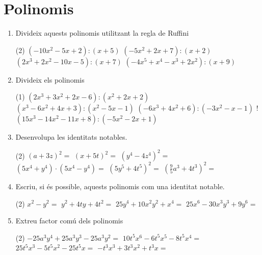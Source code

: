 \documentclass[a4paper]{article},
\begin{document}
  \section{Polinomis}
      \begin{enumerate}[resume]
    \item Divideix aquests polinomis utilitzant la regla de Ruffini
    \begin{tasks}(2)
      \task $\left(-10 x^{2} -5 x + 2\right) : \left( x + 5\right)$
      \task $\left(-5 x^{2} + 2 x + 7\right) : \left( x + 2\right)$
      \task $\left(2 x^{3} + 2 x^{2} -10 x -5\right) : \left( x + 7\right)$
      \task $\left(-4 x^{5} +  x^{4} - x^{3} + 2 x^{2}  \right) : \left( x + 9\right)$
    \end{tasks}
    \item Divideix els polinomis
    \begin{tasks}(1)
      \task $\left(2 x^{3} + 3 x^{2} + 2 x -6\right) : \left( x^{2} + 2 x + 2\right)$
      \task $\left( x^{3} -6 x^{2} + 4 x + 3\right) : \left( x^{2} -5 x -1\right)$
      \task $\left(-6 x^{3} + 4 x^{2}  + 6\right) : \left(-3 x^{2} - x -1\right)$
      \task! $\left(15 x^{3} -14 x^{2} -11 x + 8\right) : \left(-5 x^{2} -2 x + 1\right)$
    \end{tasks}
    \item Desenvolupa les identitats notables.
    \begin{tasks}(2)
      \task $\left(a + 3 z\right)^2 = {}$
      \task $\left(x + 5 t\right)^2 = {}$
      \task $\left(y^{4} - 4 z^{4}\right)^2 = {}$
      \task $\left(5 x^{4} + y^{4}\right) \cdot \left(5 x^{4} - y^{4}\right) = {}$
      \task $\left(5 y^{5} + 4 t^{5}\right)^2 = {}$
      \task $\left(\frac{9}{5} a^{3} + 4 t^{3}\right)^2 = {}$
    \end{tasks}
    \item Escriu, si és possible, aquests polinomis com una identitat notable.
    \begin{tasks}(2)
      \task $x^{2} -y^{2} = {}$
      \task $y^{2} +4 t y +4 t^{2} = {}$
      \task $25 y^{4} +10 x^{2} y^{2} +x^{4} = {}$
      \task $25 x^{6} -30 x^{3} y^{3} +9 y^{6} = {}$
    \end{tasks}
    \item Extreu factor comú dels polinomis
    \begin{tasks}(2)
      \task $-25 a^{3} y^{4} +25 a^{3} y^{3} -25 a^{3} y^{2} = {}$
      \task $10 t^{5} x^{6} -6 t^{5} x^{5} -8 t^{5} x^{4} = {}$
      \task $25 t^{5} x^{3} -5 t^{5} x^{2} -25 t^{5} x = {}$
      \task $-t^{3} x^{3} +3 t^{3} x^{2} +t^{3} x = {}$
    \end{tasks}
     \end{enumerate}
\end{document}
